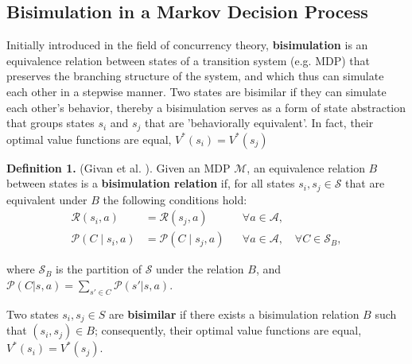 \subsection{Bisimulation in a Markov Decision Process}
Initially introduced in the field of concurrency theory, \textbf{bisimulation} \cite{li2006towards, abate2024bisimulation, baier2008principles} is an equivalence relation between states of a transition system (e.g. MDP) that preserves the branching structure of the system, and which thus can simulate each other in a stepwise manner. Two states are bisimilar if they can simulate each other's behavior, thereby a bisimulation serves as a form of state abstraction that groups states \(s_i\) and \(s_j\) that are 'behaviorally equivalent'. In fact, their optimal value functions are equal, \(V^\ast(s_i) = V^\ast(s_j)\)

\textbf{Definition 1.} (Givan et al. \cite{givan2003equivalence}). Given an MDP $\mathcal{M}$, an equivalence relation $B$ between states is a \textbf{bisimulation relation} if, for all states $s_i, s_j \in \mathcal{S}$ that are equivalent under $B$ the following conditions hold:
\begin{equation}
\begin{aligned}
\mathcal{R}\left(s_i, a\right) & =\mathcal{R}\left(s_j, a\right) & & \forall a \in \mathcal{A}, \\
\mathcal{P}\left(C \mid s_i, a\right) & =\mathcal{P}\left(C \mid s_j, a\right) & & \forall a \in \mathcal{A}, \quad \forall C \in \mathcal{S}_B,
\end{aligned}
\end{equation}

where $\mathcal{S}_B$ is the partition of $\mathcal{S}$ under the relation $B$, and $\mathcal{P}(C|s, a) = \sum_{s' \in C} \mathcal{P}(s'|s, a)$.

Two states $s_i, s_j \in S$ are \textbf{bisimilar} if there exists a bisimulation relation $B$ such that $(s_i, s_j) \in B$; consequently, their optimal value functions are equal, \(V^\ast(s_i) = V^\ast(s_j)\).




